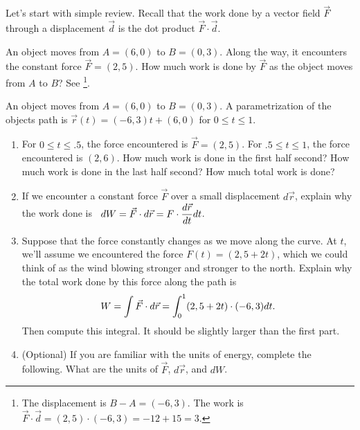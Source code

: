 Let's start with simple review. Recall that the work done by a vector field $\vec F$ through a displacement $\vec d$ is the dot product $\vec F\cdot \vec d$. 
\begin{review*}
 An object moves from $A=(6,0)$ to $B=(0,3)$. Along the way, it encounters the constant force $\vec F = (2,5)$.  How much work is done by $\vec F$ as the object moves from $A$ to $B$? See \footnote{The displacement is $B-A=(-6,3)$. The work is $\vec F\cdot \vec d = (2,5)\cdot(-6,3) = -12+15=3$.}.
\end{review*}

\begin{problem}
 An object moves from $A=(6,0)$ to $B=(0,3)$. A parametrization of the objects path is $\vec r(t) = (-6,3)t+(6,0)$ for $0\leq t\leq 1$.  
\begin{enumerate}
 \item  For $0\leq t\leq .5$, the force encountered is $\vec F = (2,5)$.  For $.5\leq t\leq 1$, the force encountered is $(2,6)$.  How much work is done in the first half second? How much work is done in the last half second?  How much total work is done?
 \item If we encounter a constant force $\vec F$ over a small displacement $d\vec r$, explain why the work done is \
$\displaystyle dW = \vec F\cdot d\vec r =F\cdot \frac{d\vec r}{dt}dt $. 
 \item{}%
Suppose that the force constantly changes as we move along the curve. At $t$, we'll assume we encountered the force $F(t) = (2,5+2t)$, which we could think of as the wind blowing stronger and stronger to the north.  
 Explain why the total work done by this force along the path is $$\displaystyle W=\int \vec F\cdot d\vec r = \int_0^1 (2,5+2t)\cdot (-6,3)dt.$$ Then compute this integral. It should be slightly larger than the first part. 
 \item (Optional) If you are familiar with the units of energy, complete the following. What are the units of $\vec F$,  $d\vec r$, and $dW$.
\end{enumerate}
\end{problem}

